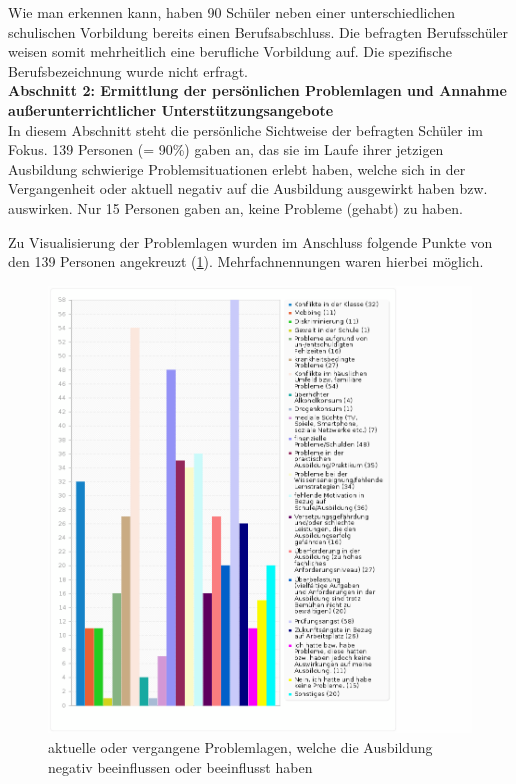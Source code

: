 Wie man erkennen kann, haben 90 Schüler neben einer unterschiedlichen schulischen Vorbildung bereits einen Berufsabschluss. Die befragten Berufsschüler weisen somit mehrheitlich eine berufliche Vorbildung auf. Die spezifische Berufsbezeichnung wurde nicht erfragt.\\

\textbf{Abschnitt 2: Ermittlung der persönlichen Problemlagen und Annahme außerunterrichtlicher Unterstützungsangebote}\\

In diesem Abschnitt steht die persönliche Sichtweise der befragten Schüler im Fokus. 139 Personen (= 90\%) gaben an, das sie im Laufe ihrer jetzigen Ausbildung schwierige Problemsituationen erlebt haben, welche sich in der Vergangenheit oder aktuell negativ auf die Ausbildung ausgewirkt haben bzw. auswirken. Nur 15 Personen gaben an, keine Probleme (gehabt) zu haben. 

Zu Visualisierung der Problemlagen wurden im Anschluss folgende Punkte von den 139 Personen angekreuzt (\ref{fig:Aktuelle-oder-vergangene-Probleme-der-Schueler-welche-die-Ausbildung-negativ-beeinflussen-oder-negativ-beeinflusst-haben}). Mehrfachnennungen waren hierbei möglich.  

\begin{figure}[hp]
	\centering
		\includegraphics[width=1.0\textwidth]{images/Aktuelle-oder-vergangene-Probleme-der-Schueler-welche-die-Ausbildung-negativ-beeinflussen-oder-negativ-beeinflusst-haben.png}
	\caption{aktuelle oder vergangene Problemlagen, welche die Ausbildung negativ beeinflussen oder beeinflusst haben}
	\label{fig:Aktuelle-oder-vergangene-Probleme-der-Schueler-welche-die-Ausbildung-negativ-beeinflussen-oder-negativ-beeinflusst-haben}
\end{figure}

